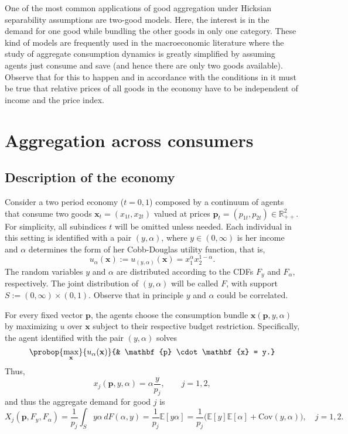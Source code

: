 \documentclass[english, a4paper,12pt]{article}
\begin{document}
One of the most common applications of good aggregation under Hicksian separability assumptions are two-good models. Here, the interest is in the demand for one good while bundling the other goods in only one category. These kind of models are frequently used in the macroeconomic literature where the study of aggregate consumption dynamics is greatly simplified by assuming agents just consume and save (and hence there are only two goods available). Observe that for this to happen and in accordance with the conditions in \cite{Lewbel96} it must be true that relative prices of all goods in the economy have to be independent of income and the price index. 

\section{Aggregation across consumers} \label{sec:aggcons}


\subsection{Description of the economy}
Consider a two period economy ($t = 0,1$) composed by a continuum of agents that consume two goods $\mathbf{x}_{t} = (x_{1t}, x_{2t})$ valued at prices $\mathbf{p}_{t} = (p_{1t}, p_{2t}) \in \mathbb{R}^{2}_{++}$. For simplicity, all subindices $t$ will be omitted unless needed. Each individual in this setting is identified with a pair $(y,\alpha)$, where $y \in (0,\infty)$ is her income and $\alpha$ determines the form of her Cobb-Douglas utility function, that is,
	$$u_{\alpha}(\mathbf{x}) := u_{(y,\alpha)}(\mathbf{x}) = x_{1}^{\alpha}x_{2}^{1-\alpha}.$$
The random variables $y$ and $\alpha$ are distributed according to the CDFs $F_{y}$ and $F_{\alpha}$, respectively. The joint distribution of $(y,\alpha)$ will be called $F$, with support $S := (0,\infty) \times (0,1)$. Observe that in principle $y$ and $\alpha$ could be correlated. 

For every fixed vector $\mathbf{p}$, the agents choose the consumption bundle $\mathbf{x}(\mathbf{p}, y, \alpha)$ by maximizing $u$ over $\mathbf{x}$ subject to their respective budget restriction. Specifically, the agent identified with the pair $(y,\alpha)$ solves
	$$\probop{\max_{\mathbf{x}}}{u_{\alpha}(\mathbf{x})}
							{&	\mathbf{p} \cdot \mathbf{x} = y.}$$ 
Thus,
	$$x_{j}(\mathbf{p}, y, \alpha) = \alpha \frac{y}{p_{j}}, \qquad j = 1,2,$$
and thus the aggregate demand for good $j$ is
	$$X_{j}(\mathbf{p}, F_{y}, F_{\alpha})
		= \frac{1}{p_{j}} \int_{S} y\alpha \,dF(\alpha,y)
		= \frac{1}{p_{j}}\mathbb{E}[y\alpha]
		= \frac{1}{p_{j}}\Big(\mathbb{E}[y]\mathbb{E}[\alpha] + \mathrm{Cov}(y,\alpha)\Big), \quad j = 1,2.
	$$
\end{document}
